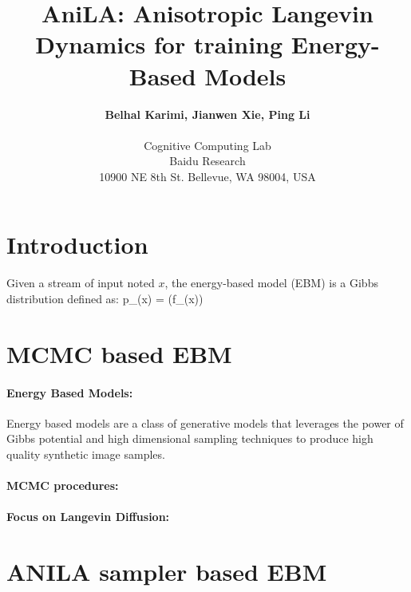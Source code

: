 \documentclass{article}
\begin{document}
\title{AniLA: Anisotropic Langevin Dynamics for training Energy-Based Models}

 \author{\textbf{Belhal Karimi, Jianwen Xie, Ping Li} \\\\
 Cognitive Computing Lab\\
 Baidu Research\\
   10900 NE 8th St. Bellevue, WA 98004, USA
 }

\date{}
\maketitle

\begin{abstract}
\end{abstract}

\section{Introduction}

Given a stream of input noted $x$, the energy-based model (EBM) is a Gibbs distribution defined as:
\beq\label{eq:ebm}
p_{\theta}(x) =  (f_{\theta}(x))
\eeq


\section{MCMC based EBM}

\paragraph{Energy Based Models: }
Energy based models are a class of generative models that leverages the power of Gibbs potential and high dimensional sampling techniques to produce high quality synthetic image samples.

\paragraph{MCMC procedures: }

\paragraph{Focus on Langevin Diffusion: }

\section{ANILA sampler based EBM}
\end{document}
